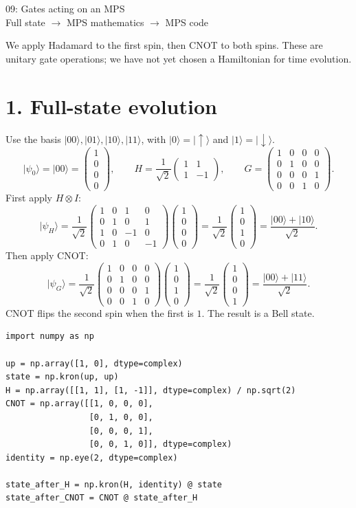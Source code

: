 \documentclass[11pt]{article}
\newcommand{\ket}[1]{\lvert #1\rangle}
\newcommand{\vfour}[4]{\begin{pmatrix}#1\\#2\\#3\\#4\end{pmatrix}}
\newcommand{\mtwo}[4]{\begin{pmatrix}#1&#2\\#3&#4\end{pmatrix}}
\begin{document}
\begin{center}
{\LARGE 09: Gates acting on an MPS}\\[5pt]
{\large Full state $\longrightarrow$ MPS mathematics $\longrightarrow$ MPS code}
\end{center}
We apply Hadamard to the first spin, then CNOT to both spins. These are unitary gate operations; we have not yet chosen a Hamiltonian for time evolution.

\section*{1. Full-state evolution}
Use the basis $\ket{00},\ket{01},\ket{10},\ket{11}$, with $\ket{0}=\ket{\uparrow}$ and $\ket{1}=\ket{\downarrow}$.
\[
\ket{\psi_0}=\ket{00}=\vfour{1}{0}{0}{0},\qquad
H=\frac1{\sqrt2}\mtwo{1}{1}{1}{-1},\qquad
G=\begin{pmatrix}1&0&0&0\\0&1&0&0\\0&0&0&1\\0&0&1&0\end{pmatrix}.
\]
First apply $H\otimes I$:
\[
\ket{\psi_H}
=\frac1{\sqrt2}\begin{pmatrix}1&0&1&0\\0&1&0&1\\1&0&-1&0\\0&1&0&-1\end{pmatrix}
\vfour{1}{0}{0}{0}
=\frac1{\sqrt2}\vfour{1}{0}{1}{0}
=\frac{\ket{00}+\ket{10}}{\sqrt2}.
\]
Then apply CNOT:
\[
\ket{\psi_G}
=\frac1{\sqrt2}\begin{pmatrix}1&0&0&0\\0&1&0&0\\0&0&0&1\\0&0&1&0\end{pmatrix}
\vfour{1}{0}{1}{0}
=\frac1{\sqrt2}\vfour{1}{0}{0}{1}
=\frac{\ket{00}+\ket{11}}{\sqrt2}.
\]
CNOT flips the second spin when the first is $1$. The result is a Bell state.

\begin{lstlisting}
import numpy as np

up = np.array([1, 0], dtype=complex)
state = np.kron(up, up)
H = np.array([[1, 1], [1, -1]], dtype=complex) / np.sqrt(2)
CNOT = np.array([[1, 0, 0, 0],
                 [0, 1, 0, 0],
                 [0, 0, 0, 1],
                 [0, 0, 1, 0]], dtype=complex)
identity = np.eye(2, dtype=complex)

state_after_H = np.kron(H, identity) @ state
state_after_CNOT = CNOT @ state_after_H
\end{lstlisting}
\end{document}
